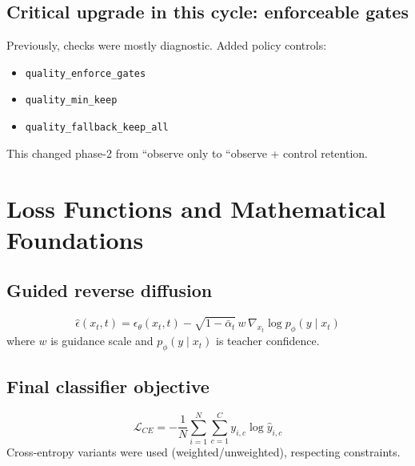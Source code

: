 \documentclass[11pt,a4paper]{article}
\begin{document}
\subsection{Critical upgrade in this cycle: enforceable gates}
Previously, checks were mostly diagnostic. Added policy controls:
\begin{itemize}[leftmargin=1.2em]
    \item \texttt{quality\_enforce\_gates}
    \item \texttt{quality\_min\_keep}
    \item \texttt{quality\_fallback\_keep\_all}
\end{itemize}
This changed phase-2 from ``observe only to ``observe + control retention.

\section{Loss Functions and Mathematical Foundations}
\subsection{Guided reverse diffusion}
\[
\hat{\epsilon}(x_t,t)=\epsilon_\theta(x_t,t)-\sqrt{1-\bar{\alpha}_t}\,w\,\nabla_{x_t}\log p_\phi(y\mid x_t)
\]
where $w$ is guidance scale and $p_\phi(y\mid x_t)$ is teacher confidence.

\subsection{Final classifier objective}
\[
\mathcal{L}_{CE}=-\frac{1}{N}\sum_{i=1}^{N}\sum_{c=1}^{C} y_{i,c}\log \hat{y}_{i,c}
\]
Cross-entropy variants were used (weighted/unweighted), respecting constraints.
\end{document}
